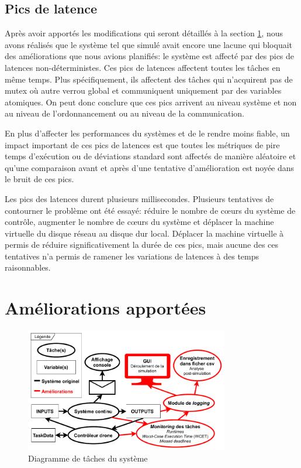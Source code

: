 \documentclass[journal]{IEEEtran}
\begin{document}
\subsection{Pics de latence}

Après avoir apportés les modifications qui seront détaillés à la section \ref{ameliorations}, nous avons réalisés que le système tel que simulé avait encore une lacune qui bloquait des améliorations que nous avions planifiés: le système est affecté par des pics de latences non-déterministes. Ces pics de latences affectent toutes les tâches en même temps. Plus spécifiquement, ils affectent des tâches qui n'acquirent pas de mutex où autre verrou global et communiquent uniquement par des variables atomiques. On peut donc conclure que ces pics arrivent au niveau système et non au niveau de l'ordonnancement ou au niveau de la communication. 

En plus d'affecter les performances du systèmes et de le rendre moins fiable, un impact important de ces pics de latences est que toutes les métriques de pire temps d'exécution ou de déviations standard sont affectés de manière aléatoire et qu'une comparaison avant et après d'une tentative d'amélioration est noyée dans le bruit de ces pics.

Les pics des latences durent plusieurs millisecondes. Plusieurs tentatives de contourner le problème ont été essayé: réduire le nombre de cœurs du système de contrôle, augmenter le nombre de cœurs du système et déplacer la machine virtuelle du disque réseau au disque dur local. Déplacer la machine virtuelle à permis de réduire significativement la durée de ces pics, mais aucune des ces tentatives n'a permis de ramener les variations de latences à des temps raisonnables.

\section{Améliorations apportées}
\label{ameliorations}
\begin{figure}
	\centering
	\captionsetup{justification=centering}
	\includegraphics[width=3.5in]{diagrammeDeTaches_Simple.pdf}
	\caption{Diagramme de tâches du système}
	\label{taskDiagram}
\end{figure}
\end{document}
